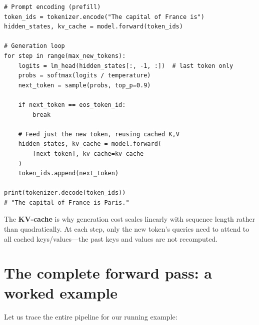 \documentclass[11pt, twoside, openright]{memoir}
\begin{document}
\begin{lstlisting}[caption={Autoregressive generation (simplified)}]
# Prompt encoding (prefill)
token_ids = tokenizer.encode("The capital of France is")
hidden_states, kv_cache = model.forward(token_ids)

# Generation loop
for step in range(max_new_tokens):
    logits = lm_head(hidden_states[:, -1, :])  # last token only
    probs = softmax(logits / temperature)
    next_token = sample(probs, top_p=0.9)

    if next_token == eos_token_id:
        break

    # Feed just the new token, reusing cached K,V
    hidden_states, kv_cache = model.forward(
        [next_token], kv_cache=kv_cache
    )
    token_ids.append(next_token)

print(tokenizer.decode(token_ids))
# "The capital of France is Paris."
\end{lstlisting}

\begin{keyidea}
The \textbf{KV-cache} is why generation cost scales linearly with sequence
length rather than quadratically.  At each step, only the new token's
queries need to attend to all cached keys/values---the past keys and values
are not recomputed.
\end{keyidea}

\section{The complete forward pass: a worked example}

Let us trace the entire pipeline for our running example:
\end{document}
